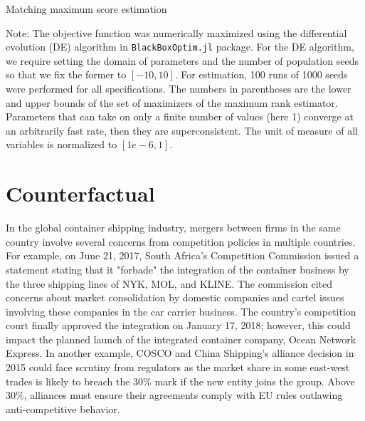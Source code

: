 \documentclass[10pt]{article}
\begin{document}
\begin{table}[!htbp]
  \begin{center}
      \caption{Matching maximum score estimation}
      \label{tb:maximum_score_estimate} 
      
  \end{center}\footnotesize
  Note: The objective function was numerically maximized using the differential evolution (DE) algorithm in \texttt{BlackBoxOptim.jl} package. For the DE algorithm, we require setting the domain of parameters and the number of population seeds so that we fix the former to $[-10, 10]$. For estimation, 100 runs of 1000 seeds were performed for all specifications. The numbers in parentheses are the lower and upper bounds of the set of maximizers of the maximum rank estimator. Parameters that can take on only a finite number of values (here 1) converge at an arbitrarily fast rate, then they are superconsistent. The unit of measure of all variables is normalized to $[1e-6,1]$. 
\end{table} 

\section{Counterfactual}\label{sec:counterfactuals}

In the global container shipping industry, mergers between firms in the same country involve several concerns from competition policies in multiple countries.
For example, on June 21, 2017, South Africa's Competition Commission issued a statement stating that it "forbade" the integration of the container business by the three shipping lines of NYK, MOL, and KLINE. 
The commission cited concerns about market consolidation by domestic companies and cartel issues involving these companies in the car carrier business.
The country's competition court finally approved the integration on January 17, 2018; however, this could impact the planned launch of the integrated container company, Ocean Network Express. 
In another example, COSCO and China Shipping's alliance decision in 2015 could face scrutiny from regulators as the market share in some east-west trades is likely to breach the 30\% mark if the new entity joins the group. Above 30\%, alliances must ensure their agreements comply with EU rules outlawing anti-competitive behavior.
\end{document}
